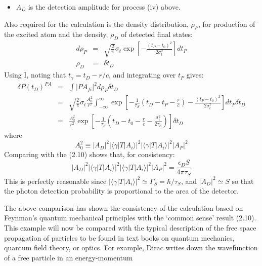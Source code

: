 {\begin{itemize}
     The last member of (2.13) follows since the photon is a massless particle with constant velocity $c$:
     $c = E_{\gamma}/p_{\gamma} = r/(t_D-t_{\gamma})$.
 \item $A_D$ is the detection amplitude for process (iv) above.
   \end{itemize}
      Also required for the calculation is the density distribution, $\rho_P$, for 
    production of the excited 
    atom and the density, $\rho_D$ of detected final states:
  \begin{eqnarray}
   d\rho_P & = & \sqrt{\frac{2}{\pi}}\sigma_t \exp\left[ - \frac{(t_P-t_0)^2}{2\sigma_t^2}\right] dt_P  \\
       \rho_D & = &  \delta t_D
  \end{eqnarray}
   Using I, noting that $t_{\gamma} = t_D-r/c$, and integrating over $t_P$ gives:
 \begin{eqnarray}
  \delta P(t_D)^{PA} &=& \int | PA_{fi}|^2 d\rho_P \delta t_D~~~~~~~~~~~~~~~~~~~~~~~~~~~~~~~~ \nonumber \\
     &=& \sqrt{\frac{2}{\pi}}\sigma_t \frac{A_0^2}{r^2}                                
   \int_{-\infty}^{\infty}
    \exp\left[-\frac{1}{\tau_S}(t_D-t_P-\frac{r}{c})
     - \frac{(t_P-t_0)^2}{2 \sigma_t^2}\right] dt_P \delta t_D \nonumber \\
    &=&  \frac{A_0^2}{r^2}\exp\left[-\frac{1}{\tau_S}(t_D -t_0-\frac{r}{c}-\frac{\sigma_t^2}{2\tau_S})\right]
       \delta t_D    
 \end{eqnarray}
 where \[ A_0^2 \equiv |A_D|^2 |\langle\gamma|T|A_i\rangle|^2 |\langle\gamma|T|A_i\rangle|^2 |A_P|^2 \]     
   Comparing with the (2.10) shows that, for consistency:
    \begin{equation}
    |A_D|^2|\langle\gamma|T|A_i\rangle|^2|\langle\gamma|T|A_i\rangle|^2 |A_P |^2 =
    \frac{\epsilon_D S }{4 \pi \tau_S}    
  \end{equation}
     This is perfectly reasonable since $ |\langle\gamma|T|A_i\rangle|^2 \simeq  \Gamma_S = \hbar/ \tau_S$,
     and $ |A_D|^2  \simeq S$ so that the photon detection probability is
    proportional to the area of the detector.
    \par The above comparison has shown the consistency of the calculation based on Feynman's
    quantum mechanical principles with the `common sense' result (2.10). This example will
     now be compared with the typical description of the free space propagation of particles
    to be found in text books on quantum mechanics, quantum field theory, or optics.
    For example, Dirac writes down the wavefunction of a free particle in an energy-momentum
}
